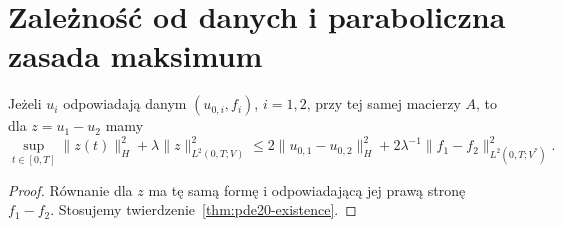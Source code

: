\section{Zależność od danych i paraboliczna zasada maksimum}
\begin{wniosek}\label{cor:pde20-stability}
Jeżeli $u_i$ odpowiadają danym $(u_{0,i},f_i)$, $i=1,2$,
przy tej samej macierzy $A$, to dla $z=u_1-u_2$ mamy
\[
 \sup_{t\in[0,T]}\|z(t)\|_H^2
 +\lambda\|z\|_{L^2(0,T;V)}^2
 \le2\|u_{0,1}-u_{0,2}\|_H^2
 +2\lambda^{-1}\|f_1-f_2\|_{L^2(0,T;V^*)}^2.
\]
\end{wniosek}
\begin{proof}
Równanie dla $z$ ma tę samą formę i odpowiadającą jej prawą
stronę $f_1-f_2$. Stosujemy twierdzenie~\ref{thm:pde20-existence}.
\end{proof}

